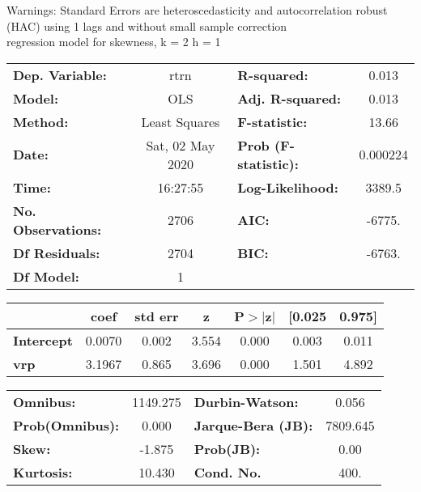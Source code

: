 Warnings: \newline
 [1] Standard Errors are heteroscedasticity and autocorrelation robust (HAC) using 1 lags and without small sample correction\\ 

regression model for skewness, k = 2 h = 1\begin{center}
\begin{tabular}{lclc}
\toprule
\textbf{Dep. Variable:}    &       rtrn       & \textbf{  R-squared:         } &     0.013   \\
\textbf{Model:}            &       OLS        & \textbf{  Adj. R-squared:    } &     0.013   \\
\textbf{Method:}           &  Least Squares   & \textbf{  F-statistic:       } &     13.66   \\
\textbf{Date:}             & Sat, 02 May 2020 & \textbf{  Prob (F-statistic):} &  0.000224   \\
\textbf{Time:}             &     16:27:55     & \textbf{  Log-Likelihood:    } &    3389.5   \\
\textbf{No. Observations:} &        2706      & \textbf{  AIC:               } &    -6775.   \\
\textbf{Df Residuals:}     &        2704      & \textbf{  BIC:               } &    -6763.   \\
\textbf{Df Model:}         &           1      & \textbf{                     } &             \\
\bottomrule
\end{tabular}
\begin{tabular}{lcccccc}
                   & \textbf{coef} & \textbf{std err} & \textbf{z} & \textbf{P$> |$z$|$} & \textbf{[0.025} & \textbf{0.975]}  \\
\midrule
\textbf{Intercept} &       0.0070  &        0.002     &     3.554  &         0.000        &        0.003    &        0.011     \\
\textbf{vrp}       &       3.1967  &        0.865     &     3.696  &         0.000        &        1.501    &        4.892     \\
\bottomrule
\end{tabular}
\begin{tabular}{lclc}
\textbf{Omnibus:}       & 1149.275 & \textbf{  Durbin-Watson:     } &    0.056  \\
\textbf{Prob(Omnibus):} &   0.000  & \textbf{  Jarque-Bera (JB):  } & 7809.645  \\
\textbf{Skew:}          &  -1.875  & \textbf{  Prob(JB):          } &     0.00  \\
\textbf{Kurtosis:}      &  10.430  & \textbf{  Cond. No.          } &     400.  \\
\bottomrule
\end{tabular}
\end{center}

